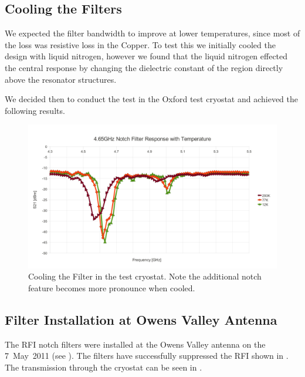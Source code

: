 \clearpage
\subsection{Cooling the Filters}

We expected the filter bandwidth to improve at lower temperatures, since most of the loss was resistive loss in the Copper. To test this we initially cooled the design with liquid nitrogen, however we found that the liquid nitrogen effected the central response by changing the dielectric constant of the region directly above the resonator structures.

We decided then to conduct the test in the Oxford test cryostat and achieved the following results.

\begin{figure}[ht]
 \centering
 \includegraphics[width=\textwidth]{./images/NotchFilter/CoolingResponse.jpg}
 \caption{Cooling the Filter in the test cryostat. Note the additional notch feature becomes more pronounce when cooled.}
 \label{fig:coolingResponse}
\end{figure}
\clearpage

\subsection{Filter Installation at Owens Valley Antenna}

The RFI notch filters were installed at the Owens Valley antenna on the 7~May~2011 (see ). The filters have successfully suppressed the RFI shown in . The transmission through the cryostat can be seen in .

